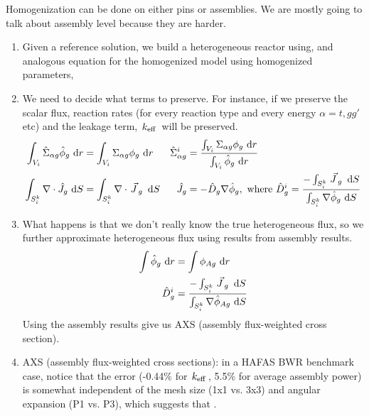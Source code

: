 \documentclass{school-22.211-notes}
\begin{document}
\clearpage
{}
Homogenization can be done on either pins or assemblies. We are mostly going to talk about assembly level because they are harder. 
\begin{enumerate}
\item Given a reference solution, we build a heterogeneous reactor using,
and analogous equation for the homogenized model using homogenized parameters,

\item We need to decide what terms to preserve. For instance, if we preserve the scalar flux, reaction rates (for every reaction type and every energy $\alpha = t, gg'$ etc) and the leakage term, $\left. k_{\mathrm{eff}} \right.$ will be preserved. 
\begin{align}
\int_{V_i} \hat{\Sigma}_{\alpha g} \hat{\phi}_g \mbox{ }\mathrm{d} r &= \int_{V_i} \Sigma_{\alpha g} \phi_g \mbox{ }\mathrm{d} r  & \hat{\Sigma}_{\alpha g}^i &= \frac{\int_{V_i} \Sigma_{\alpha g} \phi_g \mbox{ }\mathrm{d} r}{\int_{V_i} \hat{\phi}_g \mbox{ }\mathrm{d} r} \\
\int_{S_i^k} \nabla \cdot \hat{J}_g \mbox{ }\mathrm{d} S &= \int_{S_i^k} \nabla \cdot \left.\vec{J}\right._g \mbox{ }\mathrm{d} S & \hat{J}_g &= - \hat{D}_g \nabla \hat{\phi}_g, \mbox{ where } \hat{D}_g^i = \frac{-\int_{S_i^k} \left.\vec{J}\right._g \mbox{ }\mathrm{d} S}{\int_{S_i^k} \nabla \hat{\phi}_g \mbox{ }\mathrm{d} S}
\end{align}

\item What happens is that we don't really know the true heterogeneous flux, so we further approximate heterogeneous flux using results from assembly results.
\begin{align}
\int \hat{\phi}_g \mbox{ }\mathrm{d} r &= \int \phi_{Ag} \mbox{ }\mathrm{d} r  \\
\hat{D}_g^i &= \frac{-\int_{S_i^k} \left.\vec{J}\right._g \mbox{ }\mathrm{d} S}{\int_{S_i^k} \nabla \hat{\phi}_{Ag} \mbox{ }\mathrm{d} S}
\end{align}
Using the assembly results give us AXS (assembly flux-weighted cross section). 

\item AXS (assembly flux-weighted cross sections): in a HAFAS BWR benchmark case, notice that the error (-0.44\% for $\left. k_{\mathrm{eff}} \right.$, 5.5\% for average assembly power) is somewhat independent of the mesh size (1x1 vs. 3x3) and angular expansion (P1 vs. P3), which suggests that  . 


\end{enumerate}
\end{document}
